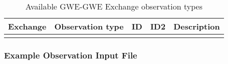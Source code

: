\begin{longtable}{p{2cm} p{2.75cm} p{2cm} p{1.25cm} p{7cm}}
\caption{Available GWE-GWE Exchange observation types} \tabularnewline

\hline
\hline
\textbf{Exchange} & \textbf{Observation type} & \textbf{ID} & \textbf{ID2} & \textbf{Description} \\
\hline
\endhead

\hline
\endfoot


\label{table:gwe-gweobstype}
\end{longtable}


\vspace{5mm}
\subsubsection{Example Observation Input File}


